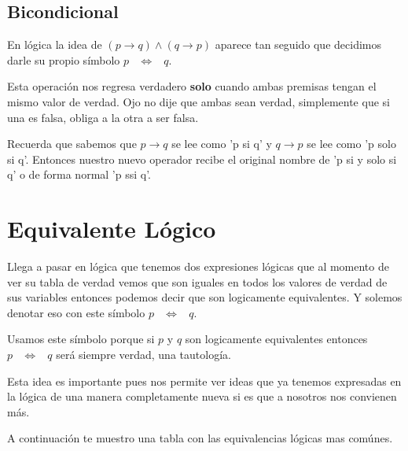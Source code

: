 \documentclass[12pt, fleqn]{report}                             %
\DeclareMathOperator \Space     {\quad}                         %
\DeclareMathOperator \MiniSpace {\;}                            %
\theoremstyle{break}                                            %
\newcommand \lEqual  {\MiniSpace \Leftrightarrow \MiniSpace}    %
\begin{document}
            \clearpage
            \subsection{Bicondicional}

                En lógica la idea de $(p \to q ) \land (q \to p)$ aparece tan seguido que decidimos darle su
                propio símbolo $p \lEqual q$.

                Esta operación nos regresa verdadero \textbf{solo} cuando ambas premisas tengan el mismo valor de
                verdad. Ojo no dije que ambas sean verdad, simplemente que si una es falsa, obliga a la otra a 
                ser falsa.

                Recuerda que sabemos que $p \to q$ se lee como 'p si q' y $q \to p$ se lee como 'p solo si q'.
                Entonces nuestro nuevo operador recibe el original nombre de 'p si y solo si q' o de forma normal
                'p ssi q'.



        \section{Equivalente Lógico}

            Llega a pasar en lógica que tenemos dos expresiones lógicas que al momento de ver su tabla de 
            verdad vemos que son iguales en todos los valores de verdad de sus variables entonces podemos
            decir que son logicamente equivalentes. Y solemos denotar eso con este símbolo $p \lEqual q$.

            Usamos este símbolo porque si $p$ y $q$ son logicamente equivalentes entonces $p \lEqual q$
            será siempre verdad, una tautología.

            Esta idea es importante pues nos permite ver ideas que ya tenemos expresadas en la lógica de una
            manera completamente nueva si es que a nosotros nos convienen más.

            A continuación te muestro una tabla con las equivalencias lógicas mas comúnes.
\end{document}
